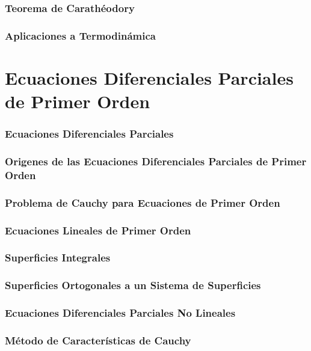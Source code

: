 \section{Teorema de Carathéodory}

\section{Aplicaciones a Termodinámica}


\newpage
\part{Ecuaciones Diferenciales Parciales de Primer Orden}

\section{Ecuaciones Diferenciales Parciales}

\section{Origenes de las Ecuaciones Diferenciales Parciales de Primer Orden}

\section{Problema de Cauchy para Ecuaciones de Primer Orden}

\section{Ecuaciones Lineales de Primer Orden}

\section{Superficies Integrales}

\section{Superficies Ortogonales a un Sistema de Superficies}

\section{Ecuaciones Diferenciales Parciales No Lineales}

\section{Método de Características de Cauchy}

